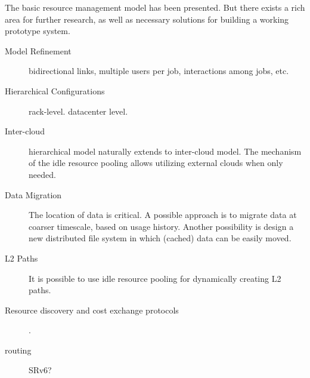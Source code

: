 
The basic resource management model has been presented.
But there exists a rich area for further research, as well as
necessary solutions for building a working prototype system.

\begin{description}

      \item[Model Refinement]  bidirectional links, multiple users per job,
            interactions among jobs, etc.

      \item[Hierarchical Configurations]
            rack-level.  datacenter level.

      \item[Inter-cloud]
            hierarchical model naturally extends to inter-cloud model.
            The mechanism of the idle resource pooling allows utilizing external
            clouds when only needed.

      \item[Data Migration]
            The location of data is critical.
            A possible approach is to migrate data at coarser timescale, based
            on usage history.
            Another possibility is design a new distributed file system in which
            (cached) data can be easily moved.

      \item[L2 Paths] It is possible to use idle resource pooling for dynamically
            creating L2 paths.

      \item[Resource discovery and cost exchange protocols]
            \cite{Albrecht2008}.

      \item[routing] SRv6?

\end{description}
